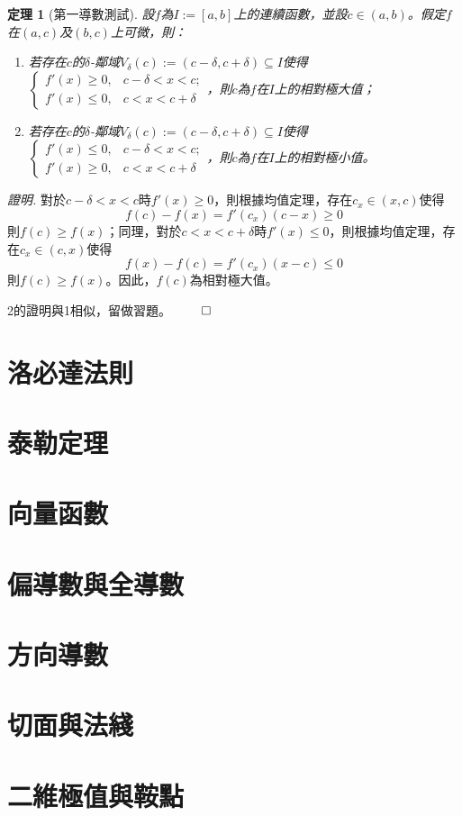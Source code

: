 \documentclass[12pt]{article}
\newtheorem*{theorem}{定理}
\renewenvironment*{proof}{\textit{證明.}}{\hfill$\qed$}
\begin{document}
    \begin{theorem}[第一導數測試]
        設$f$為$I:=[a,b]$上的連續函數，並設$c\in(a,b)$。假定$f$在$(a,c)$及$(b,c)$上可微，則：\begin{enumerate}
            \item 若存在$c$的$\delta$-鄰域$V_\delta(c):=(c-\delta,c+\delta)\subseteq I$使得$\begin{cases}
                f'(x)\geq 0, &c-\delta<x<c;\\
                f'(x)\leq 0, &c<x<c+\delta
            \end{cases}$，則$c$為$f$在$I$上的相對極大值；
            \item 若存在$c$的$\delta$-鄰域$V_\delta(c):=(c-\delta,c+\delta)\subseteq I$使得$\begin{cases}
                f'(x)\leq 0, &c-\delta<x<c;\\
                f'(x)\geq 0, &c<x<c+\delta
            \end{cases}$，則$c$為$f$在$I$上的相對極小值。
        \end{enumerate}
    \end{theorem}

    \begin{proof}
        對於$c-\delta<x<c$時$f'(x)\geq 0$，則根據均值定理，存在$c_x\in(x,c)$使得$$f(c)-f(x)=f'(c_x)(c-x)\geq 0$$則$f(c)\geq f(x)$；同理，對於$c<x<c+\delta$時$f'(x)\leq 0$，則根據均值定理，存在$c_x\in(c,x)$使得$$f(x)-f(c)=f'(c_x)(x-c)\leq 0$$則$f(c)\geq f(x)$。因此，$f(c)$為相對極大值。

        2的證明與1相似，留做習題。
    \end{proof}

    \section*{洛必達法則}

    \section*{泰勒定理}

    \section*{向量函數}

    \section*{偏導數與全導數}

    \section*{方向導數}

    \section*{切面與法綫}

    \section*{二維極值與鞍點}
\end{document}
